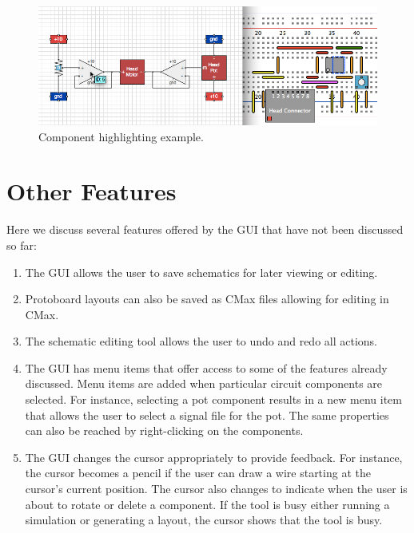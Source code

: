 \begin{figure}
\begin{center}
\includegraphics[width=\textwidth]{Images/gui_component_highlight.png}
\caption[GUI component highlighting example]{Component highlighting example.}
\label{fig:component_highlight}
\end{center}
\end{figure}

\section{Other Features}

Here we discuss several features offered by the GUI that have not been discussed
so far:

\begin{enumerate}
\item The GUI allows the user to save schematics for later viewing or editing.
\item Protoboard layouts can also be saved as CMax files allowing for editing
in CMax.
\item The schematic editing tool allows the user to undo and redo all actions.
\item The GUI has menu items that offer access to some of the features already
discussed. Menu items are added when particular circuit components are selected.
For instance, selecting a pot component results in a new menu item that allows
the user to select a signal file for the pot. The same properties can also be
reached by right-clicking on the components.
\item The GUI changes the cursor appropriately to provide feedback. For instance,
the cursor becomes
a pencil if the user can draw a wire starting at the cursor's current position.
The cursor also changes to indicate when the user is about to rotate or delete
a component. If the tool is busy either running a simulation or generating a
layout, the cursor shows that the tool is busy.
\end{enumerate}

